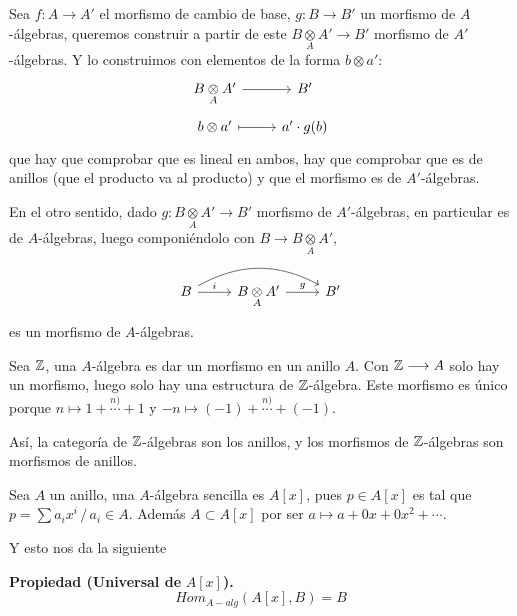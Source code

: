 \begin{dem}
    Sea $f : A \longrightarrow A'$ el morfismo de cambio de base, $g: B \longrightarrow B'$ un morfismo de $A$-\'algebras, queremos construir a partir de este $B \underset{A}{\otimes} A' \longrightarrow B'$ morfismo de $A'$-\'algebras. Y lo construimos con elementos de la forma $b\otimes a'$: 
    $$\bt B \underset{A}{\otimes} A'\arrow{r} & B' \\[-5mm] b\otimes a' \arrow[mapsto]{r} & a'\cdot g(b) \et$$
    que hay que comprobar que es lineal en ambos, hay que comprobar que es de anillos (que el producto va al producto) y que el morfismo es de $A'$-\'algebras.

    En el otro sentido, dado $g: B\underset{A}{\otimes} A' \longrightarrow B'$ morfismo de $A'$-\'algebras, en particular es de $A$-\'algebras, luego componi\'endolo con $B \longrightarrow B\underset{A}{\otimes} A'$, 
    $$\bt B \arrow[bend left=10mm]{rr} \arrow{r}{i} & B\underset{A}{\otimes} A'\arrow{r}{g}& B' \et$$
    es un morfismo de $A$-\'algebras.
\end{dem}
\begin{ejem}
    Sea $\mathbb{Z}$, una $A$-\'algebra es dar un morfismo en un anillo $A$. Con $\mathbb{Z}\longrightarrow A$ solo hay un morfismo, luego solo hay una estructura de $\mathbb{Z}$-\'algebra. Este morfismo es \'unico porque $n \longmapsto 1+\overset{n)}{\cdots}+ 1$ y  $-n \longmapsto (-1)+\overset{n)}{\cdots}+ (-1)$. 

    As\'i, la categor\'ia de $\mathbb{Z}$-\'algebras son los anillos, y los morfismos de $\mathbb{Z}$-\'algebras son morfismos de anillos. 
\end{ejem}
\begin{ejem}
    Sea $A$ un anillo, una $A$-\'algebra sencilla es $A[x]$, pues $p\in A[x]$ es tal que $p = \sum a_i x^i \, / \, a_i \in A$. Adem\'as $A \subset A[x]$ por ser $a \longmapsto a+0x+0x^2 + \cdots$. 

    Y esto nos da la siguiente
\end{ejem}
\noindent \textbf{Propiedad (Universal de }$A\left[x\right]$\textbf{).}
    $$Hom_{A-alg} (A[x],B) = B$$
